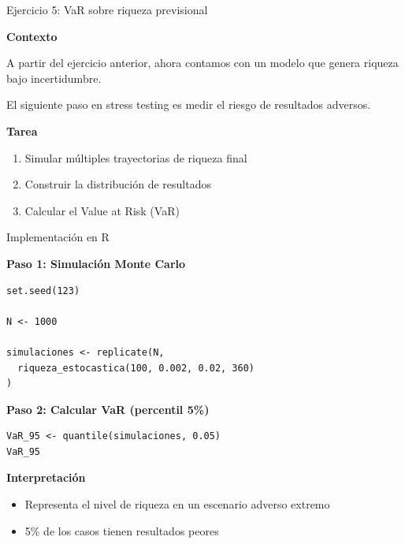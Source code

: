 \documentclass[10pt]{beamer}
\begin{document}
\begin{frame}{Ejercicio 5: VaR sobre riqueza previsional}

\textbf{Contexto}

\vspace{0.2cm}
A partir del ejercicio anterior, ahora contamos con un modelo que genera riqueza bajo incertidumbre.

\vspace{0.2cm}
El siguiente paso en stress testing es medir el riesgo de resultados adversos.

\vspace{0.4cm}

\textbf{Tarea}

\begin{enumerate}
\item Simular múltiples trayectorias de riqueza final
\item Construir la distribución de resultados
\item Calcular el Value at Risk (VaR)
\end{enumerate}

\end{frame}


\begin{frame}[fragile]{Implementación en R}

\textbf{Paso 1: Simulación Monte Carlo}

\begin{lstlisting}
set.seed(123)

N <- 1000

simulaciones <- replicate(N,
  riqueza_estocastica(100, 0.002, 0.02, 360)
)
\end{lstlisting}

\vspace{0.4cm}

\textbf{Paso 2: Calcular VaR (percentil 5\%)}

\begin{lstlisting}
VaR_95 <- quantile(simulaciones, 0.05)
VaR_95
\end{lstlisting}

\vspace{0.3cm}

\textbf{Interpretación}
\begin{itemize}
\item Representa el nivel de riqueza en un escenario adverso extremo
\item 5\% de los casos tienen resultados peores
\end{itemize}

\end{frame}
\end{document}
